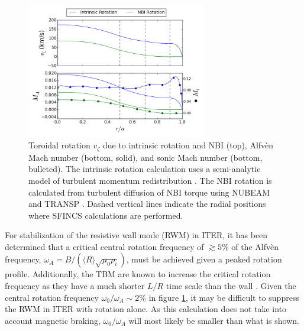 \documentclass{article}
\begin{document}
\begin{figure}[h!]
\centering
\includegraphics[width=0.7\textwidth]{rotationestimate.png}
\caption{\label{fig:rotation_estimate} Toroidal rotation $v_{\zeta}$ due to intrinsic rotation and NBI (top), Alfv\`{e}n Mach number  (bottom, solid), and sonic Mach number (bottom, bulleted). The intrinsic rotation calculation uses a semi-analytic model of turbulent momentum redistribution \cite{Hillesheim2015}. The NBI rotation is calculated from turbulent diffusion of NBI torque using NUBEAM and TRANSP \cite{Poli2014}. Dashed vertical lines indicate the radial positions where SFINCS calculations are performed. }
\end{figure}

For stabilization of the resistive wall mode (RWM) in ITER, it has been determined that a critical central rotation frequency of $\gtrsim5\%$ of the Alfv\`{e}n frequency, $\omega_A = B/(\langle R\rangle\sqrt{\mu_0 \rho_i})$, must be achieved given a peaked rotation profile. Additionally, the TBM are known to increase the critical rotation frequency as they have a much shorter $L/R$ time scale than the wall \cite{Liu2004}. Given the central rotation frequency $\omega_0/\omega_A \sim 2\%$ in figure \ref{fig:rotation_estimate}, it may be difficult to suppress the RWM in ITER with rotation alone. As this calculation does not take into account magnetic braking, $\omega_0/\omega_A$ will most likely be smaller than what is shown. 
\end{document}
